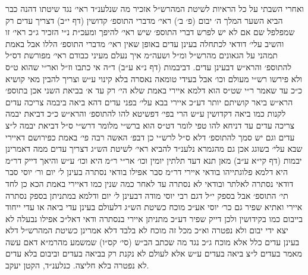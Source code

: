 \documentclass[12pt, openany]{book}
\begin{document}
\begin{multicols}{2}
ואחרי השבתי על כל הראיות לשיטת המהרש״ל אזכיר מה שנלענ״ד ראי׳ נגד שיטתו דהנה כבר הביא השער המלך ה׳ יבום (פ׳ ב׳) ראי׳ מדברי התוספ׳ קדושין (דף י״ב) דצריך עדים רק שמפלפל שם אם לא יש לפרש דברי התוספ׳ שיש ראי׳ להיפך ומעכ״ת נ״י הזכיר ג״כ ראי׳ זו והשיב עלי׳ דודאי לכתחלה בעינן עדים באופן שאין ראי׳ מדברי התוספ׳ הללו אבל באמת תמהני על הגאונים מהרש״ל ומ״ל ושעה״מ איך נעלם מעיני כבודם ראי׳ מפורשת דס״ל להתוספ׳ והרא״ש דבעינן עדים. דביבמות (דף נ״א ע״ב) ד״ה אי כתבו וז״ל ואר״י שהוא ט״ס ולא פירשו רש״י מעולם וכו׳ אבל בעידי טומאה נאסרה בלא קינוי ע״ש וצריך להבין מאי קושיא כ״כ עד שאמר ר״י שט״ס הוא דלמא איירי באמת שלא הי׳ רק עד א׳ בביאת השני אכן בתוספ׳ הרא״ש ביאר קושיתם יותר דע״כ איירי בבא עלי׳ בפני עדים דהא ביאה ביבמה צריכה עדים לקנות כמו ביאה דקדושין ע״ש הרי בפי׳ דפשיטא להו להתוספ׳ והרא״ש כ״כ דביאת יבמה צריכה עדים עד דניחא להו טפי לומר דט״ס הוא ברש״י מלומר דרש״י ס״ל דביאת יבמה ל״צ עדים וגם יש סמך להתוספ׳ דלא ס״ל לרש״י כן דבפ׳ האשה רבה פי׳ באמת כפירושם דאיירי שבא עלי׳ בשוגג אכן גם מהגמרא נלענ״ד להביא ראי׳ לשיטת הש״ג דצריך עדים ממה דאמרינן יבמות (דף קי״א ע״ב) מאן תנא דעד תלתין יומין וכו׳ אר״י ר״מ היא וכו׳ ע״ש והיאך דייק דר״מ היא דלמא פלוגתייהו בודאי איירי דר״מ סבר אפילו בודאי נסתרה בעינן ל׳ יום ור׳ יוסי סבר דודאי נסתרה לאלתר ובודאי לא נסתרה עד לאחר כמה שנין כמו דאיירי באמת הכא כן לחד תי׳ התוספ׳ אבל בספק י״ל דגם רבי יוסי מודה דבעינן ל׳ יום ודלמא במתניתן בספק נסתרה איירי ואתיא שפיר גם כר׳ יוסי אע״כ מוכח כשיטת הש״ג דלעולם בעינן עדי ביאה או עדי ייחוד בייבום כמו בקידושין ולכן דייק שפיר דע״כ מתניתן איירי בנסתרה ודאי דאל״כ אפילו נבעלה לא יצא ידי יבום ולא נפטרה וא״כ מכל זה מוכח לא בלבד דלא אמרינן כשיטת המהרש״ל דלא בעינן עדים כלל אלא מוכח ג״כ נגד מה שכתב הב״ש (סי׳ קס״ו) שמשמע מהרמ״א דאם עשה מאמר בעדים ל״צ ביאה בעדים ע״ש אלא לעולם לא נקנת רק בביאה בעדים וביבום בלא עדים לא נפטרה בלא חליצה. כנלענ״ד, הקטן יעקב.\\\vspace{0pt}

\end{multicols}\newpage
\end{document}
